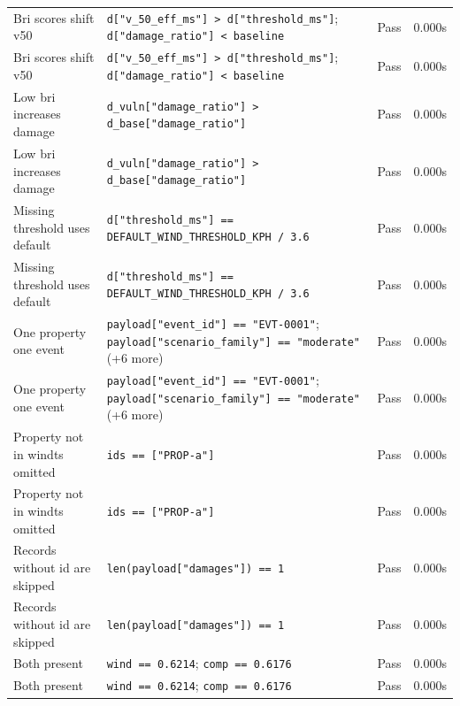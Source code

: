 \documentclass[11pt,a4paper]{article}
\begin{document}
\begin{longtable}{p{6cm}p{5.5cm}cc}
    Bri scores shift v50 & {\scriptsize \texttt{d["v\_50\_eff\_ms"] > d["threshold\_ms"]}; \texttt{d["damage\_ratio"] < baseline}} & \textcolor{green!60!black}{Pass} & 0.000s \\
    Bri scores shift v50 & {\scriptsize \texttt{d["v\_50\_eff\_ms"] > d["threshold\_ms"]}; \texttt{d["damage\_ratio"] < baseline}} & \textcolor{green!60!black}{Pass} & 0.000s \\
    Low bri increases damage & {\scriptsize \texttt{d\_vuln["damage\_ratio"] > d\_base["damage\_ratio"]}} & \textcolor{green!60!black}{Pass} & 0.000s \\
    Low bri increases damage & {\scriptsize \texttt{d\_vuln["damage\_ratio"] > d\_base["damage\_ratio"]}} & \textcolor{green!60!black}{Pass} & 0.000s \\
    Missing threshold uses default & {\scriptsize \texttt{d["threshold\_ms"] == DEFAULT\_WIND\_THRESHOLD\_KPH / 3.6}} & \textcolor{green!60!black}{Pass} & 0.000s \\
    Missing threshold uses default & {\scriptsize \texttt{d["threshold\_ms"] == DEFAULT\_WIND\_THRESHOLD\_KPH / 3.6}} & \textcolor{green!60!black}{Pass} & 0.000s \\
    One property one event & {\scriptsize \texttt{payload["event\_id"] == "EVT-0001"}; \texttt{payload["scenario\_family"] == "moderate"} (+6 more)} & \textcolor{green!60!black}{Pass} & 0.000s \\
    One property one event & {\scriptsize \texttt{payload["event\_id"] == "EVT-0001"}; \texttt{payload["scenario\_family"] == "moderate"} (+6 more)} & \textcolor{green!60!black}{Pass} & 0.000s \\
    Property not in windts omitted & {\scriptsize \texttt{ids == ["PROP-a"]}} & \textcolor{green!60!black}{Pass} & 0.000s \\
    Property not in windts omitted & {\scriptsize \texttt{ids == ["PROP-a"]}} & \textcolor{green!60!black}{Pass} & 0.000s \\
    Records without id are skipped & {\scriptsize \texttt{len(payload["damages"]) == 1}} & \textcolor{green!60!black}{Pass} & 0.000s \\
    Records without id are skipped & {\scriptsize \texttt{len(payload["damages"]) == 1}} & \textcolor{green!60!black}{Pass} & 0.000s \\
    Both present & {\scriptsize \texttt{wind == 0.6214}; \texttt{comp == 0.6176}} & \textcolor{green!60!black}{Pass} & 0.000s \\
    Both present & {\scriptsize \texttt{wind == 0.6214}; \texttt{comp == 0.6176}} & \textcolor{green!60!black}{Pass} & 0.000s \\

\end{longtable}
\end{document}
